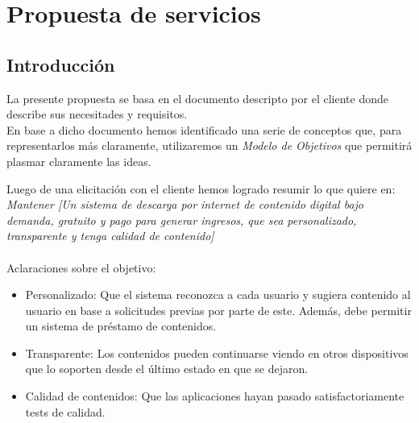 \documentclass[11pt, a4paper, spanish]{article}
\newenvironment{borde}[1]
{\begin{lrbox}{\fmbox}\begin{minipage}{#1}}
{\end{minipage}\end{lrbox}\fbox{\usebox{\fmbox}}\\[10pt]}
\begin{document}
	



\section{Propuesta de servicios}
\label{sec:Propuesta de servicios}

\subsection{Introducci\'on}

	La presente propuesta se basa en el documento descripto por el cliente donde describe sus necesitades y requisitos.\\

	En base a dicho documento hemos identificado una serie de conceptos que, para representarlos m\'as claramente, utilizaremos un \emph{Modelo de Objetivos} que permitir\'a plasmar claramente las ideas.

	Luego de una elicitaci\'on con el cliente hemos logrado resumir lo que quiere en: \\

	\emph{Mantener [Un sistema de descarga por internet de contenido digital bajo demanda, gratuito y pago para generar ingresos, que sea personalizado, transparente y tenga calidad de contenido]}\\
	\\
	Aclaraciones sobre el objetivo:
\begin{itemize}
	
\item {Personalizado: Que el sistema reconozca a cada usuario y sugiera contenido al usuario en base a solicitudes previas por parte de este.
Adem\'as, debe permitir un sistema de pr\'estamo de contenidos.}
\item {Transparente: Los contenidos pueden continuarse viendo en otros dispositivos que lo soporten desde el \'ultimo estado en que se dejaron.}
\item {Calidad de contenidos: Que las aplicaciones hayan pasado satisfactoriamente tests de calidad.} 
\end{itemize}
\newpage
	
\end{document}
